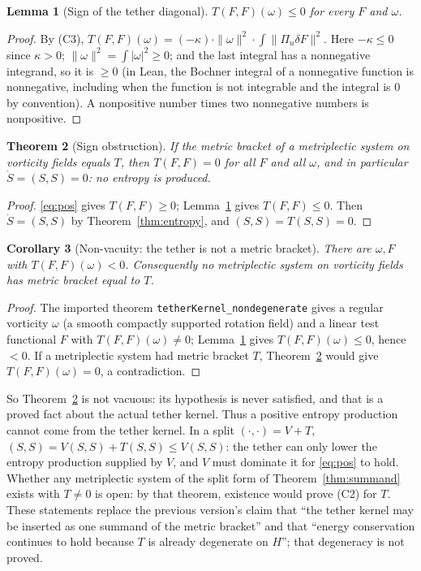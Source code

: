 \documentclass[11pt,a4paper]{article}
\newtheorem{theorem}{Theorem}[section]
\newtheorem{lemma}[theorem]{Lemma}
\newtheorem{corollary}[theorem]{Corollary}
\begin{document}
\begin{lemma}[Sign of the tether diagonal]\label{lem:diag}
\(T(F,F)(\omega)\le0\) for every \(F\) and \(\omega\).
\end{lemma}
\begin{proof}
By (C3), \(T(F,F)(\omega)=(-\kappa)\cdot\|\omega\|^2\cdot\int\|\Pi_u\delta F\|^2\). Here \(-\kappa\le0\) since \(\kappa>0\);
\(\|\omega\|^2=\int|\omega|^2\ge0\); and the last integral has a nonnegative integrand, so it is \(\ge0\) (in
Lean, the Bochner integral of a nonnegative function is nonnegative, including when the function is not
integrable and the integral is \(0\) by convention). A nonpositive number times two nonnegative numbers is
nonpositive.
\end{proof}

\begin{theorem}[Sign obstruction]\label{thm:sign}
If the metric bracket of a metriplectic system on vorticity fields equals \(T\), then \(T(F,F)=0\) for all
\(F\) and all \(\omega\), and in particular \(\dot S=(S,S)=0\): no entropy is produced.
\end{theorem}
\begin{proof}
\eqref{eq:pos} gives \(T(F,F)\ge0\); Lemma~\ref{lem:diag} gives \(T(F,F)\le0\). Then \(\dot S=(S,S)\) by
Theorem~\ref{thm:entropy}, and \((S,S)=T(S,S)=0\).
\end{proof}
\begin{corollary}[Non-vacuity: the tether is not a metric bracket]\label{cor:nometric}
There are \(\omega,F\) with \(T(F,F)(\omega)<0\). Consequently no metriplectic system on vorticity fields
has metric bracket equal to \(T\).
\end{corollary}
\begin{proof}
The imported theorem \texttt{tetherKernel\_nondegenerate} gives a regular vorticity \(\omega\) (a smooth
compactly supported rotation field) and a linear test functional \(F\) with \(T(F,F)(\omega)\neq0\);
Lemma~\ref{lem:diag} gives \(T(F,F)(\omega)\le0\), hence \(<0\). If a metriplectic system had metric bracket
\(T\), Theorem~\ref{thm:sign} would give \(T(F,F)(\omega)=0\), a contradiction.
\end{proof}
So Theorem~\ref{thm:sign} is not vacuous: its hypothesis is never satisfied, and that is a proved fact
about the actual tether kernel. Thus a positive entropy production cannot come from the tether kernel. In a split \((\cdot,\cdot)=V+T\),
\((S,S)=V(S,S)+T(S,S)\le V(S,S)\): the tether can only lower the entropy production supplied by \(V\), and
\(V\) must dominate it for \eqref{eq:pos} to hold. Whether any metriplectic system of the split form of Theorem~\ref{thm:summand} exists with \(T\neq0\) is
open: by that theorem, existence would prove (C2) for \(T\). These statements replace the previous version's claim
that ``the tether kernel may be inserted as one summand of the metric bracket'' and that ``energy
conservation continues to hold because \(T\) is already degenerate on \(H\)''; that degeneracy is not proved.
\end{document}
